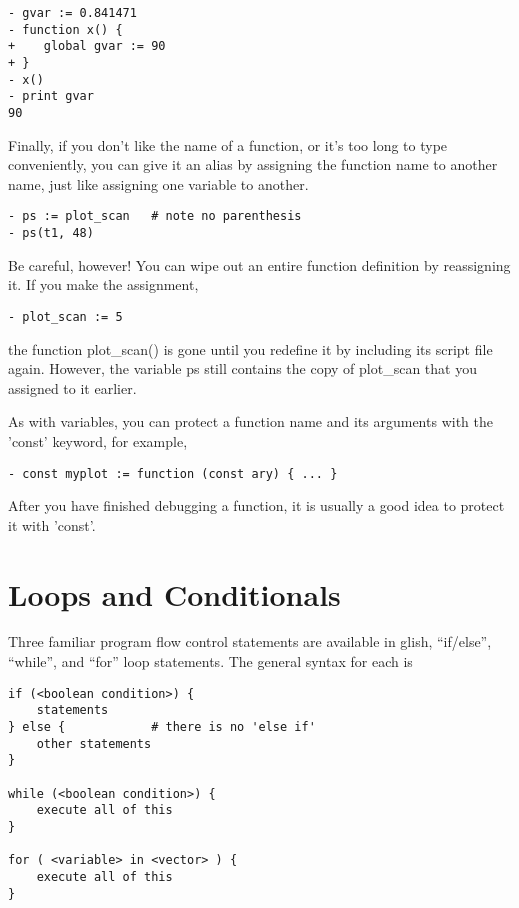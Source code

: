 \begin{verbatim}
- gvar := 0.841471
- function x() {
+    global gvar := 90
+ }
- x()
- print gvar
90
\end{verbatim}

    Finally, if you don't like the name of a function, or it's too long to
type conveniently, you can give it an alias by assigning the function name
to another name, just like assigning one variable to another.

\begin{verbatim}
- ps := plot_scan	# note no parenthesis
- ps(t1, 48)
\end{verbatim}

Be careful, however!  You can wipe out an entire function definition by
reassigning it.  If you make the assignment,

\begin{verbatim}
- plot_scan := 5
\end{verbatim}

the function plot\_scan() is gone until you redefine it by including its
script file again.  However, the variable ps still contains the copy
of plot\_scan that you assigned to it earlier.

As with variables, you can protect a function name and
its arguments with the 'const' keyword, for example,

\begin{verbatim}
- const myplot := function (const ary) { ... }
\end{verbatim}

After you have finished debugging a function, it is usually a good idea to
protect it with 'const'.

\section{Loops and Conditionals}

    Three familiar program flow control statements are available in glish,
``if/else'', ``while'', and ``for'' loop statements.  The general syntax for each
is

\begin{verbatim}
if (<boolean condition>) {
    statements
} else {			# there is no 'else if'
    other statements
}

while (<boolean condition>) {
    execute all of this
}

for ( <variable> in <vector> ) {
    execute all of this
}
\end{verbatim}

